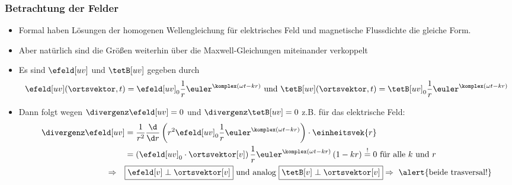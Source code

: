 \begin{frame}
  \frametitle{Betrachtung der Felder}
  \begin{itemize}[<+->]
  \item Formal haben Lösungen der homogenen Wellengleichung für elektrisches Feld und magnetische Flussdichte die \alert{gleiche Form}.
  \item Aber natürlich sind die Größen weiterhin über die Maxwell-Gleichungen miteinander \alert{verkoppelt}
  \item Es sind \(\efeld[uv]\) und \(\tetB[uv]\) gegeben durch
    \begin{equation*}
      \efeld[uv](\ortsvektor, t) = \efeld[uv]_0 \frac{1}{r} \euler^{\komplex(\omega t - kr)} \text{ und } \tetB[uv](\ortsvektor, t) = \tetB[uv]_0 \frac{1}{r} \euler^{\komplex(\omega t - kr)}
    \end{equation*}
  \item Dann folgt wegen \(\divergenz \efeld[uv] = 0\) und \(\divergenz\tetB[uv]=0\) z.B. für das elektrische Feld:
     \begin{align*}
      \divergenz \efeld[uv]  & = \frac{1}{r^2} \frac{\d}{\d r} \left( r^2 \efeld[uv]_0 \frac{1}{r} \euler^{\komplex(\omega t -kr)} \right) \cdot \einheitsvek{r} \\
                             &= \left( \efeld[uv]_0 \cdot \ortsvektor[v] \right) \frac{1}{r} \euler^{\komplex(\omega t -kr)} \left(1- kr \right) \stackrel{!}{=} 0 \text{ für alle } k \text{ und } r  \\
       \Rightarrow \quad & \boxed{\efeld[v] \perp \ortsvektor[v]} \text{ und analog } \boxed{\tetB[v] \perp \ortsvektor[v]} \Rightarrow \text{ \alert{beide trasversal!}}
       \end{align*}
     \end{itemize}
  \end{frame}

